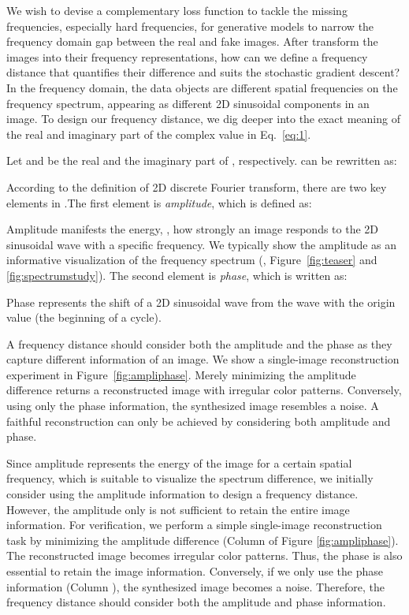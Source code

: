 \documentclass[10pt,twocolumn,letterpaper]{article}
\begin{document}
We wish to devise a complementary loss function to tackle the missing frequencies, especially hard frequencies, for generative models to narrow the frequency domain gap between the real and fake images.
After transform the images into their frequency representations, how can we define a frequency distance that quantifies their difference and suits the stochastic gradient descent?
In the frequency domain, the data objects are different spatial frequencies on the frequency spectrum, appearing as different 2D sinusoidal components in an image.
To design our frequency distance, we dig deeper into the exact meaning of the real and imaginary part of the complex value  in Eq.~\eqref{eq:1}.
\fi 

Let  and  be the real and the imaginary part of , respectively.  can be rewritten as:

According to the definition of 2D discrete Fourier transform, there are two key elements in .The first element is \textit{amplitude}, which is defined as:

Amplitude manifests the energy, \ie, how strongly an image responds to the 2D sinusoidal wave with a specific frequency. We typically show the amplitude as an informative visualization of the frequency spectrum (\eg, Figure~\ref{fig:teaser} and \ref{fig:spectrumstudy}).
The second element is \textit{phase}, which is written as:

Phase represents the shift of a 2D sinusoidal wave from the wave with the origin value (the beginning of a cycle).

A frequency distance should consider both the amplitude and the phase as they capture different information of an image.
We show a single-image reconstruction experiment in Figure~\ref{fig:ampliphase}.
Merely minimizing the amplitude difference returns a reconstructed image with irregular color patterns.
Conversely, using only the phase information, the synthesized image resembles a noise.
A faithful reconstruction can only be achieved by considering both amplitude and phase.

Since amplitude represents the energy of the image for a certain spatial frequency, which is suitable to visualize the spectrum difference, we initially consider using the amplitude information to design a frequency distance.
However, the amplitude only is not sufficient to retain the entire image information.
For verification, we perform a simple single-image reconstruction task by minimizing the amplitude difference (Column  of Figure \ref{fig:ampliphase}).
The reconstructed image becomes irregular color patterns.
Thus, the phase is also essential to retain the image information.
Conversely, if we only use the phase information (Column ), the synthesized image becomes a noise.
Therefore, the frequency distance should consider both the amplitude and phase information.
\fi
\end{document}
